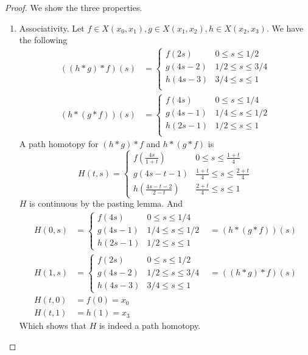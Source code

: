 \begin{proof}
  We show the three properties.
  \begin{enumerate}
    \item Associativity.
      Let \( f \in X(x_0, x_1), g \in X(x_1, x_2), h \in X(x_2, x_3) \).
      We have the following
      \begin{align}
        \left(\left(h * g\right) * f\right)(s) &= \begin{cases}
          f(2s) & 0 \le s \le 1/2 \\
          g(4s - 2) & 1/2 \le s \le 3/4 \\
          h(4s - 3) & 3/4 \le s \le 1 \\
                    \end{cases} \\
          \left(h * \left(g * f\right)\right)(s) &= \begin{cases}
          f(4s) & 0 \le s \le 1/4 \\
          g(4s - 1) & 1/4 \le s \le 1/2 \\
          h(2s - 1) & 1/2 \le s \le 1 \\
        \end{cases}
      \end{align}
      A path homotopy for \( (h * g) * f \) and \( h * (g * f) \) is
      \begin{equation}
          H(t, s) = \begin{cases}
            f\left(\frac{4s}{1+t}\right) & 0 \le s \le \frac{1+t}{4} \\
            g\left(4s - t - 1\right) & \frac{1+t}{4} \le s \le \frac{2+t}{4} \\
            h\left(\frac{4s-t-2}{2-t}\right) & \frac{2+t}{4} \le s \le 1
          \end{cases}
      \end{equation}
      \( H \) is continuous by the pasting lemma. And
      \begin{align}
        H(0, s)  &= \begin{cases}
          f(4s) & 0 \le s \le 1/4 \\
          g(4s - 1) & 1/4 \le s \le 1/2 \\
          h(2s - 1) & 1/2 \le s \le 1
        \end{cases} 
                 &= \left(h * \left(g * f\right)\right)(s) \\
          H(1, s) &= \begin{cases}
            f(2s) & 0 \le s \le 1/2 \\
            g(4s - 2) & 1/2 \le s \le 3/4 \\
            h(4s - 3) & 3/4 \le s \le 1
            \end{cases} 
                  &= \left((h * g) * f\right)(s) \\
            H(t, 0) &= f(0) = x_0 \\
            H(t, 1) &= h(1) = x_3
      \end{align}
      Which shows that \( H \) is indeed a path homotopy.


\end{enumerate}
\end{proof}
